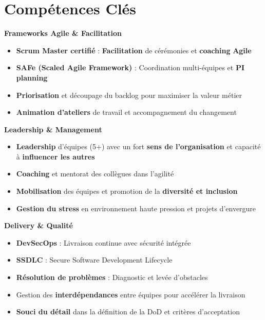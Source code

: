 \documentclass[11pt,a4paper]{article}
\newcommand{\highlight}[1]{\textcolor{primaryblue}{\textbf{#1}}}
\newcommand{\skilltitle}[1]{\normalsize\textcolor{primaryblue}{\textbf{#1}}}
\begin{document}
\section*{Compétences Clés}

\begin{minipage}[t]{0.55\textwidth}
\skilltitle{Frameworks Agile \& Facilitation}
\begin{itemize}[leftmargin=10pt]
    \item \highlight{Scrum Master certifié} : \highlight{Facilitation} de cérémonies et \highlight{coaching} \highlight{Agile}
    \item \highlight{SAFe (Scaled Agile Framework)} : Coordination multi-équipes et \highlight{PI planning}
    \item \highlight{Priorisation} et découpage du backlog pour maximiser la valeur métier
    \item \highlight{Animation d'ateliers} de travail et accompagnement du changement
\end{itemize}

\skilltitle{Leadership \& Management}
\begin{itemize}[leftmargin=10pt]
    \item \highlight{Leadership} d'équipes (5+) avec un fort \highlight{sens de l'organisation} et capacité à \highlight{influencer les autres}
    \item \highlight{Coaching} et mentorat des collègues dans l'agilité
    \item \highlight{Mobilisation} des équipes et promotion de la \highlight{diversité et inclusion}
    \item \highlight{Gestion du stress} en environnement haute pression et projets d'envergure
\end{itemize}

\skilltitle{Delivery \& Qualité}
\begin{itemize}[leftmargin=10pt]
    \item \highlight{DevSecOps} : Livraison continue avec sécurité intégrée
    \item \highlight{SSDLC} : Secure Software Development Lifecycle
    \item \highlight{Résolution de problèmes} : Diagnostic et levée d'obstacles
    \item Gestion des \highlight{interdépendances} entre équipes pour accélérer la livraison
    \item \highlight{Souci du détail} dans la définition de la DoD et critères d'acceptation
\end{itemize}
\end{minipage}
\end{document}
